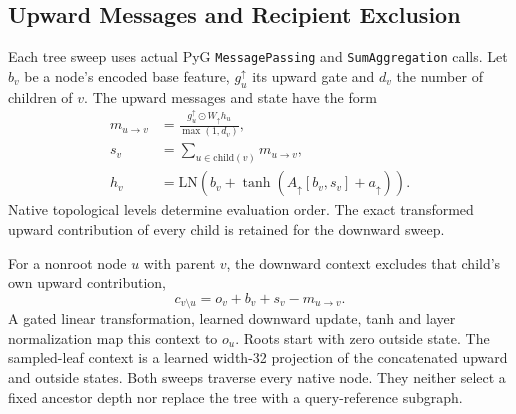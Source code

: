 \documentclass[letterpaper]{article}
\begin{document}
\subsection{Upward Messages and Recipient Exclusion}
Each tree sweep uses actual PyG \texttt{MessagePassing} and \texttt{SumAggregation} calls. Let $b_v$ be a node's encoded base feature, $g^\uparrow_u$ its upward gate and $d_v$ the number of children of $v$. The upward messages and state have the form
\begin{align}
m_{u\to v}&=\frac{g^\uparrow_u\odot W_\uparrow h_u}{\max(1,d_v)},\\
s_v&=\sum_{u\in\mathrm{child}(v)}m_{u\to v},\\
h_v&=\mathrm{LN}\!\left(b_v+
 \tanh\!\left(A_\uparrow[b_v,s_v]+a_\uparrow\right)\right).
\end{align}
Native topological levels determine evaluation order. The exact transformed upward contribution of every child is retained for the downward sweep.

For a nonroot node $u$ with parent $v$, the downward context excludes that child's own upward contribution,
\begin{equation}
c_{v\setminus u}=o_v+b_v+s_v-m_{u\to v}.
\end{equation}
A gated linear transformation, learned downward update, tanh and layer normalization map this context to $o_u$. Roots start with zero outside state. The sampled-leaf context is a learned width-32 projection of the concatenated upward and outside states. Both sweeps traverse every native node. They neither select a fixed ancestor depth nor replace the tree with a query-reference subgraph.
\end{document}
